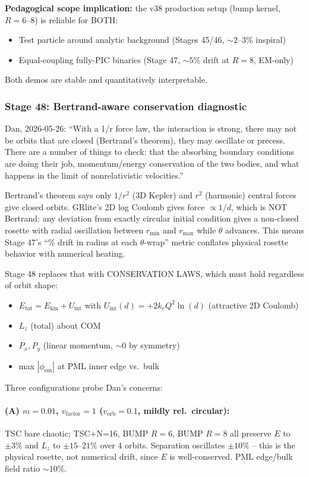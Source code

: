\documentclass[11pt,a4paper]{article}
\begin{document}
\textbf{Pedagogical scope implication:} the v38 production setup
(bump kernel, $R = 6$--$8$) is reliable for BOTH:
\begin{itemize}
  \item Test particle around analytic background (Stages 45/46, $\sim 2$--$3\%$ inspiral)
  \item Equal-coupling fully-PIC binaries (Stage 47, $\sim 5\%$ drift at $R=8$, EM-only)
\end{itemize}
Both demos are stable and quantitatively interpretable.

\subsubsection*{Stage 48: Bertrand-aware conservation diagnostic}

Dan, 2026-05-26: ``With a 1/r force law, the interaction is strong,
there may not be orbits that are closed (Bertrand's theorem), they
may oscillate or precess.  There are a number of things to check:
that the absorbing boundary conditions are doing their job,
momentum/energy conservation of the two bodies, and what happens in
the limit of nonrelativistic velocities.''

Bertrand's theorem says only $1/r^2$ (3D Kepler) and $r^2$ (harmonic)
central forces give closed orbits.  GRlite's 2D log Coulomb gives
force $\propto 1/d$, which is NOT Bertrand: any deviation from
exactly circular initial condition gives a non-closed rosette with
radial oscillation between $r_{\min}$ and $r_{\max}$ while $\theta$
advances.  This means Stage 47's ``\% drift in radius at each
$\theta$-wrap'' metric conflates physical rosette behavior with
numerical heating.

Stage 48 replaces that with CONSERVATION LAWS, which must hold
regardless of orbit shape:
\begin{itemize}
  \item $E_{\mathrm{tot}} = E_{\mathrm{kin}} + U_{\mathrm{int}}$ with
    $U_{\mathrm{int}}(d) = +2 k_e Q^2 \ln(d)$ (attractive 2D Coulomb)
  \item $L_z$ (total) about COM
  \item $P_x, P_y$ (linear momentum, $\sim 0$ by symmetry)
  \item max $|\phi_{\mathrm{em}}|$ at PML inner edge vs.\ bulk
\end{itemize}

Three configurations probe Dan's concerns:

\paragraph{(A) $m{=}0.01$, $v_{\mathrm{factor}}{=}1$ ($v_{\mathrm{orb}}{=}0.1$, mildly rel.\ circular):}
TSC bare chaotic; TSC$+$N=16, BUMP $R{=}6$, BUMP $R{=}8$ all preserve
$E$ to $\pm 3\%$ and $L_z$ to $\pm 15$--$21\%$ over 4 orbits.
Separation oscillates $\pm 10\%$ -- this is the physical rosette,
not numerical drift, since $E$ is well-conserved.  PML edge/bulk
field ratio $\sim 10\%$.
\end{document}
